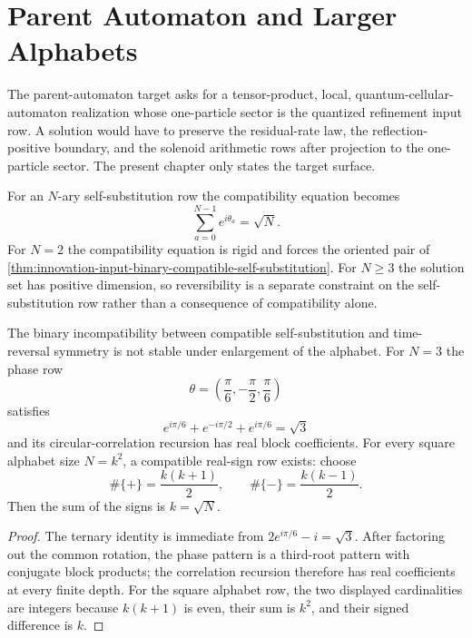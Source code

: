 \section{Parent Automaton and Larger Alphabets}
\label{sec:innovation-input-parent-automaton-larger-alphabets}

\begin{principle}
\label{prin:innovation-input-parent-automaton-target}
The parent-automaton target asks for a tensor-product, local,
quantum-cellular-automaton realization whose one-particle sector is the
quantized refinement input row. A solution would have to preserve the
residual-rate law, the reflection-positive boundary, and the solenoid
arithmetic rows after projection to the one-particle sector. The present
chapter only states the target surface.
\end{principle}

\begin{principle}
\label{prin:innovation-input-larger-alphabet-self-substitution}
For an $N$-ary self-substitution row the compatibility equation becomes
$$
\sum_{a=0}^{N-1}e^{i\theta_a}=\sqrt N.
$$
For $N=2$ the compatibility equation is rigid and forces the oriented
pair of \autoref{thm:innovation-input-binary-compatible-self-substitution}.
For $N\ge3$ the solution set has positive dimension, so reversibility is a
separate constraint on the self-substitution row rather than a consequence
of compatibility alone.
\end{principle}

\begin{theorem}
\label{thm:innovation-input-higher-alphabet-reversible-self-substitution}
The binary incompatibility between compatible self-substitution and
time-reversal symmetry is not stable under enlargement of the alphabet.
For $N=3$ the phase row
$$
\theta=\left(\frac{\pi}{6},-\frac{\pi}{2},\frac{\pi}{6}\right)
$$
satisfies
$$
e^{i\pi/6}+e^{-i\pi/2}+e^{i\pi/6}=\sqrt3
$$
and its circular-correlation recursion has real block coefficients. For
every square alphabet size $N=k^2$, a compatible real-sign row exists:
choose
$$
\#\{+\}=\frac{k(k+1)}2,
\qquad
\#\{-\}=\frac{k(k-1)}2.
$$
Then the sum of the signs is $k=\sqrt N$.
\end{theorem}

\begin{proof}
The ternary identity is immediate from
$2e^{i\pi/6}-i=\sqrt3$. After factoring out the common rotation, the phase
pattern is a third-root pattern with conjugate block products; the
correlation recursion therefore has real coefficients at every finite
depth. For the square alphabet row, the two displayed cardinalities are
integers because $k(k+1)$ is even, their sum is $k^2$, and their signed
difference is $k$.
\end{proof}

